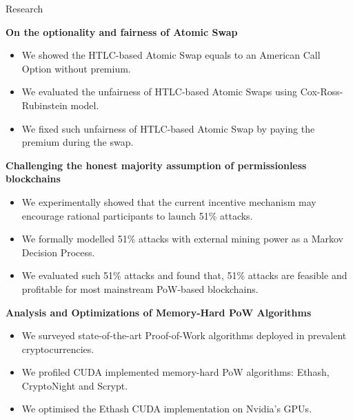 \documentclass{resume} %
\begin{document}
\begin{rSection}{Research}


\textbf{On the optionality and fairness of Atomic Swap}
\begin{itemize}
    \item We showed the HTLC-based Atomic Swap equals to an American Call Option without premium.
    \item We evaluated the unfairness of HTLC-based Atomic Swaps using Cox-Ross-Rubinstein model.
    \item We fixed such unfairness of HTLC-based Atomic Swap by paying the premium during the swap.
\end{itemize}

\textbf{Challenging the honest majority assumption of permissionless blockchains}
\begin{itemize}
    \item We experimentally showed that the current incentive mechanism may encourage rational participants to launch 51\% attacks.
    \item We formally modelled 51\% attacks with external mining power as a Markov Decision Process.
    \item We evaluated such 51\% attacks and found that, 51\% attacks are feasible and profitable for most mainstream PoW-based blockchains.
\end{itemize}

\textbf{Analysis and Optimizations of Memory-Hard PoW Algorithms}
\begin{itemize}
    \item We surveyed state-of-the-art Proof-of-Work algorithms deployed in prevalent cryptocurrencies.
    \item We profiled CUDA implemented memory-hard PoW algorithms: Ethash, CryptoNight and Scrypt.
    \item We optimised the Ethash CUDA implementation on Nvidia's GPUs.
\end{itemize}

\end{rSection}
\end{document}
